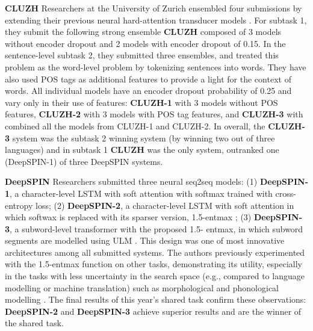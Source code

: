 \documentclass[11pt]{article}
\begin{document}
\vspace{1em} \noindent \textbf{CLUZH} Researchers at the University of Zurich ensembled four submissions \cite{cluzh_sig22} by extending their previous neural hard-attention transducer models \cite{makarov2018uzh,makarov2018imitation,makarov-clematide-2020-cluzh}. For subtask 1, they submit the following strong ensemble \textbf{CLUZH} composed of 3 models without encoder dropout and 2 models with encoder dropout of 0.15. In the sentence-level subtask 2, they submitted three ensembles, and treated this problem as the word-level problem by tokenizing sentences into words. They have also used POS tags as additional features to provide a light for the context of words. All individual models have an encoder dropout probability of 0.25 and vary only in their use of features: \textbf{CLUZH-1} with 3 models without POS features, \textbf{CLUZH-2} with 3 models with POS tag features, and \textbf{CLUZH-3} with combined all the models from CLUZH-1 and CLUZH-2. In overall, the \textbf{CLUZH-3} system was the subtask 2 winning system (by winning two out of three languages) and in subtask 1 \textbf{CLUZH} was the only system, outranked one (DeepSPIN-1) of three DeepSPIN systems. 

\vspace{1em} \noindent \textbf{DeepSPIN} Researchers submitted three neural seq2seq models: (1) \textbf{DeepSPIN-1}, a character-level LSTM with soft attention \cite{bahdanau2014neural} with softmax trained with cross-entropy loss; (2) \textbf{DeepSPIN-2}, a character-level LSTM with soft attention in which softwax is replaced with its sparser version,  1.5-entmax \cite{peters2019sigmorphon}; (3) \textbf{DeepSPIN-3}, a subword-level transformer \cite{vaswani2017attention} with the proposed 1.5- entmax, in which subword segments are  modelled using ULM \cite{kudo-2018-subword}. This design was one of most innovative architectures among all submitted systems. The authors previously experimented with the 1.5-entmax function on other tasks, demonstrating its utility, especially in the tasks with less uncertainty in the search space (e.g., compared to language modelling or machine translation) such as morphological and phonological modelling \cite{peters-martins-2020-one}. The final results of this year's shared task confirm these observations: \textbf{DeepSPIN-2} and \textbf{DeepSPIN-3} achieve superior results and are the winner of the shared task.
\end{document}
